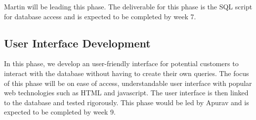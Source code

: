 \documentclass{sig-alternate}
\begin{document}
Martin will be leading this phase. The deliverable for this phase is the SQL script for database access and is expected to be completed by week 7.
\subsection{User Interface Development}
In this phase, we develop an user-friendly interface for potential customers to interact with the database without having to create their own queries. The focus of this phase will be on ease of access, understandable user interface with popular web technologies such as HTML and javascript. The user interface is then linked to the database and tested rigorously. This phase would be led by Apurav and is expected to be completed by week 9.
\end{document}

